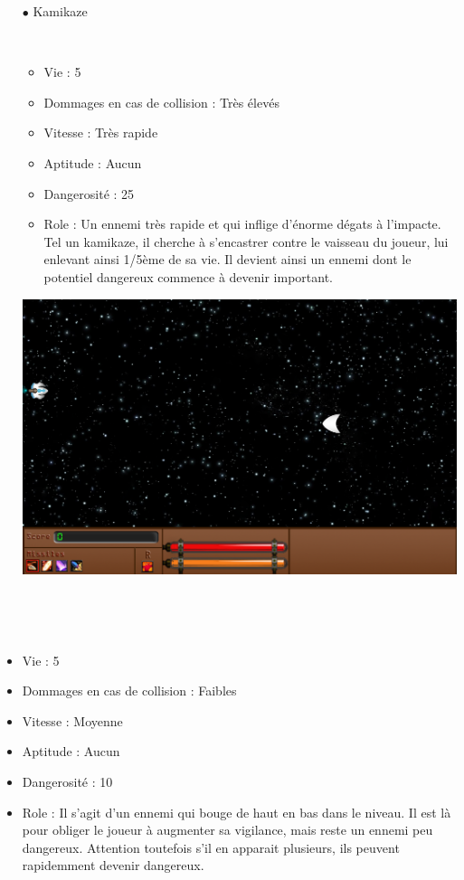 \begin{itemize}
				\par~
			\item[$\bullet$ Kamikaze]
				\par~
				\begin{itemize}			
					\item Vie : 5
					\item Dommages en cas de collision : Très élevés
					\item Vitesse : Très rapide
					\item Aptitude : Aucun
					\item Dangerosité : 25%
					\item Role : Un ennemi très rapide et qui inflige d'énorme dégats à l'impacte. Tel un kamikaze, il cherche à s'encastrer contre le vaisseau du joueur, lui enlevant ainsi 1/5ème de sa vie. Il devient ainsi un ennemi dont le potentiel dangereux commence à devenir important.
				\end{itemize}
				\includegraphics{images/vaisseaux/kamikaze.png}
				\par~
		\end{itemize}
					\item[$\bullet$ Zebra]
				\par~
				\begin{itemize}
					\item Vie : 5
					\item Dommages en cas de collision : Faibles
					\item Vitesse : Moyenne
					\item Aptitude : Aucun
					\item Dangerosité : 10%
					\item Role : Il s'agit d'un ennemi qui bouge de haut en bas dans le niveau. Il est là pour obliger le joueur à augmenter sa vigilance, mais reste un ennemi peu dangereux. Attention toutefois s'il en apparait plusieurs, ils peuvent rapidemment devenir dangereux.
				\end{itemize}

